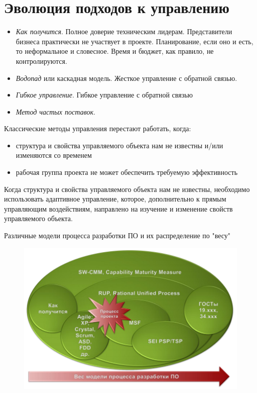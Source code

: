 \documentclass{beamer}
\begin{document}
\section{Эволюция подходов к управлению}
\begin{frame}[t]
\begin{itemize}
\item \textit{Как получится}. Полное доверие техническим лидерам. Представители бизнеса практически не участвует в проекте. Планирование, если оно и есть, то неформальное и словесное. Время
и бюджет, как правило, не контролируются.
\item \textit{Водопад} или каскадная модель. Жесткое управление с обратной связью.
\item \textit{Гибкое управление}. Гибкое управление с обратной связью
\item \textit{Метод частых поставок}.
\end{itemize}
Классические методы управления перестают работать, когда:
\begin{itemize}
\item структура и свойства управляемого объекта нам не известны и/или изменяются со временем
\item рабочая группа проекта не может обеспечить требуемую эффективность
\end{itemize}
Когда структура и свойства управляемого объекта нам не известны, необходимо использовать адаптивное управление, которое, дополнительно к прямым управляющим воздействиям, направлено на изучение и изменение свойств управляемого объекта.
\end{frame}

\begin{frame}
Различные модели процесса разработки ПО и их распределение по "весу"
\begin{figure}[h]
\centering
\includegraphics[scale=0.5]{images/lec01-pic03.png}
\label{pic-sort}
\end{figure}
\end{frame}
\end{document}
